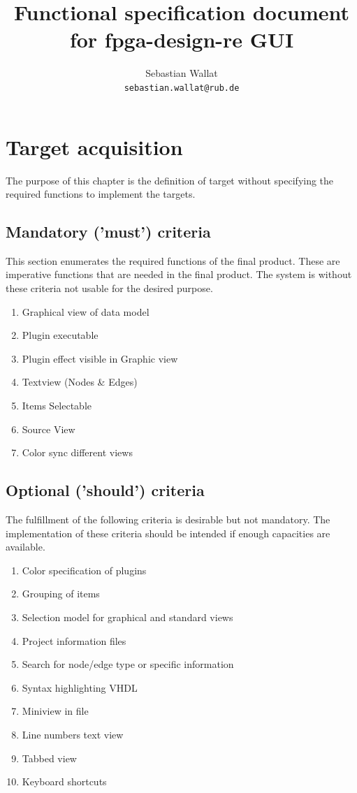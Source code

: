 \documentclass[a4paper]{scrreprt}
\begin{document}
 
\title{Functional specification document for fpga-design-re GUI}
\author{Sebastian Wallat \\
		\texttt{sebastian.wallat@rub.de}
		}
\maketitle
 
\tableofcontents
 
\chapter{Target acquisition}
The purpose of this chapter is the definition of target without specifying the required functions to implement the targets.
 
\section{Mandatory ('must') criteria}
This section enumerates the required functions of the final product. These are imperative functions that are needed in the final product. The system is without these criteria not usable for the desired purpose.

\begin{enumerate}
  \item Graphical view of data model
  \item Plugin executable
  \item Plugin effect visible in Graphic view
  \item Textview (Nodes \& Edges)
  \item Items Selectable
  \item Source View
  \item Color sync different views
\end{enumerate}

 
\section{Optional ('should') criteria}
The fulfillment of the following criteria is desirable but not mandatory. The implementation of these criteria should be intended if enough capacities are available.

\begin{enumerate}
  \item Color specification of plugins
  \item Grouping of items
  \item Selection model for graphical and standard views
  \item Project information files
  \item Search for node/edge type or specific information
  \item Syntax highlighting VHDL
  \item Miniview in file
  \item Line numbers text view
  \item Tabbed view
  \item Keyboard shortcuts
\end{enumerate}
\end{document}
